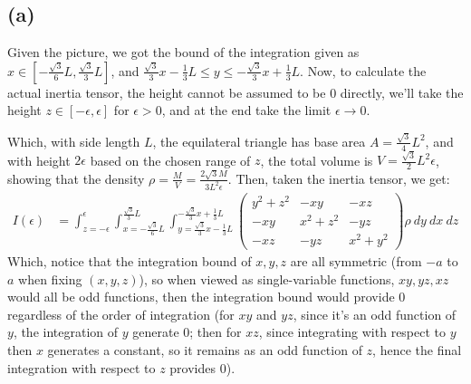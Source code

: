 \documentclass{article}
\begin{document}
\subsection*{(a)}
Given the picture, we got the bound of the integration given as $x\in [-\frac{\sqrt{3}}{6}L, \frac{\sqrt{3}}{3}L]$, and $\frac{\sqrt{3}}{3}x-\frac{1}{3}L\leq y\leq -\frac{\sqrt{3}}{3}x+\frac{1}{3}L$. Now, to calculate the actual inertia tensor,  the height cannot be assumed to be $0$ directly, we'll take the height $z\in [-\epsilon,\epsilon]$ for $\epsilon>0$, and at the end take the limit $\epsilon\rightarrow 0$. 

Which, with side length $L$, the equilateral triangle has base area $A=\frac{\sqrt{3}}{4}L^2$, and with height $2\epsilon$ based on the chosen range of $z$, the total volume is $V=\frac{\sqrt{3}}{2}L^2\epsilon$, showing that the density $\rho = \frac{M}{V}=\frac{2\sqrt{3}M}{3L^2\epsilon}$. Then, taken the inertia tensor, we get:
\begin{align}
    I(\epsilon) &= \int_{z=-\epsilon}^{\epsilon}\int_{x=-\frac{\sqrt{3}}{6}L}^{\frac{\sqrt{3}}{3}L}\int_{y=\frac{\sqrt{3}}{3}x-\frac{1}{3}L}^{-\frac{\sqrt{3}}{3}x+\frac{1}{3}L} \begin{pmatrix}
        y^2+z^2 & -xy & -xz\\
        -xy & x^2+z^2 & -yz\\
        -xz & -yz & x^2+y^2
    \end{pmatrix}\rho\ dy\ dx\ dz
\end{align}
Which, notice that the integration bound of $x,y,z$ are all symmetric (from $-a$ to $a$ when fixing $(x,y,z)$), so when viewed as single-variable functions, $xy,yz,xz$ would all be odd functions, then the integration bound would provide $0$ regardless of the order of integration (for $xy$ and $yz$, since it's an odd function of $y$, the integration of $y$ generate $0$; then for $xz$, since integrating with respect to $y$ then $x$ generates a constant, so it remains as an odd function of $z$, hence the final integration with respect to $z$ provides $0$). 
\end{document}

